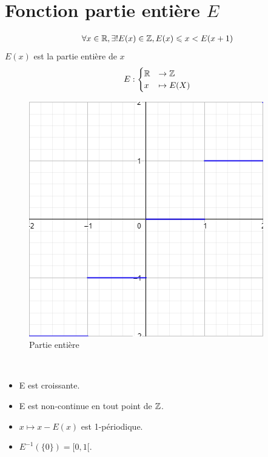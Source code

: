 \section{Fonction partie entière $E$}
\begin{graybox}
	\begin{definition}
		\begin{align*}
			\forall x \in \mathbb{R},\exists!E(x) \in \mathbb{Z}, E(x) \leqslant x < E(x+1)
		\end{align*}
		$E(x)$ est la partie entière de $x$
		\begin{align*}
			E :
			\begin{cases}
				\mathbb{R} &\to \mathbb{Z} \\
				x &\mapsto E(X)
			\end{cases}
		\end{align*}
	\end{definition}
\end{graybox}


\begin{figure}[h!]
	\centering
	\includegraphics[scale=0.5]{images/partie_entiere.png}
	\caption{Partie entière}
\end{figure}

\begin{remarque}~
	\begin{itemize}
		\item E est croissante.
		\item E est non-continue en tout point de $\mathbb{Z}$.
		\item $x \mapsto x - E(x)$ est 1-périodique.
		\item $E^{-1}(\{0\}) = [0, 1[$.
	\end{itemize}
\end{remarque}


